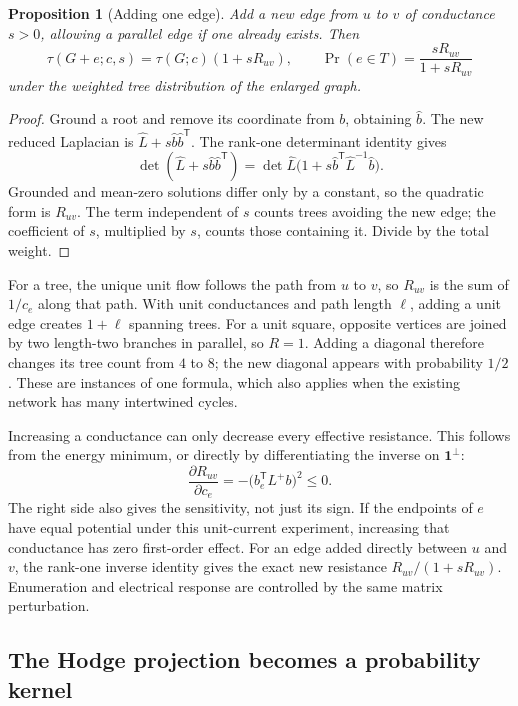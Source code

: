 \documentclass[11pt]{article}
\newtheorem{proposition}[theorem]{Proposition}
\theoremstyle{definition}
\theoremstyle{remark}
\begin{document}
\begin{proposition}[Adding one edge]\label{prop:glin-add-edge}
Add a new edge from $u$ to $v$ of conductance $s>0$, allowing a parallel edge if one already exists. Then
\begin{equation}\label{eq:glin-edge-add}
 \tau(G+e;c,s)=\tau(G;c)(1+sR_{uv}),
 \qquad
 \Pr(e\in T)=\frac{sR_{uv}}{1+sR_{uv}}
\end{equation}
under the weighted tree distribution of the enlarged graph.
\end{proposition}
\begin{proof}
Ground a root and remove its coordinate from $b$, obtaining $\widehat b$. The new reduced Laplacian is $\widehat L+s\widehat b\widehat b^{\mathsf T}$. The rank-one determinant identity gives
\[
 \det(\widehat L+s\widehat b\widehat b^{\mathsf T})
 =\det\widehat L\bigl(1+s\widehat b^{\mathsf T}\widehat L^{-1}\widehat b\bigr).
\]
Grounded and mean-zero solutions differ only by a constant, so the quadratic form is $R_{uv}$. The term independent of $s$ counts trees avoiding the new edge; the coefficient of $s$, multiplied by $s$, counts those containing it. Divide by the total weight.
\end{proof}

For a tree, the unique unit flow follows the path from $u$ to $v$, so $R_{uv}$ is the sum of $1/c_e$ along that path. With unit conductances and path length $\ell$, adding a unit edge creates $1+\ell$ spanning trees. For a unit square, opposite vertices are joined by two length-two branches in parallel, so $R=1$. Adding a diagonal therefore changes its tree count from $4$ to $8$; the new diagonal appears with probability $1/2$. These are instances of one formula, which also applies when the existing network has many intertwined cycles.

Increasing a conductance can only decrease every effective resistance. This follows from the energy minimum, or directly by differentiating the inverse on $\mathbf1^\perp$:
\[
 \frac{\partial R_{uv}}{\partial c_e}
 =-\bigl(b_e^{\mathsf T}L^+b\bigr)^2\le0.
\]
The right side also gives the sensitivity, not just its sign. If the endpoints of $e$ have equal potential under this unit-current experiment, increasing that conductance has zero first-order effect. For an edge added directly between $u$ and $v$, the rank-one inverse identity gives the exact new resistance $R_{uv}/(1+sR_{uv})$. Enumeration and electrical response are controlled by the same matrix perturbation.

\subsection{The Hodge projection becomes a probability kernel}
\end{document}

